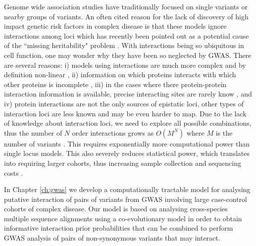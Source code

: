 Genome wide association studies have traditionally focused on single variants or nearby groups of variants. 
An often cited reason for the lack of discovery of high impact genetic risk factors in complex disease is that these models ignore interactions among loci \cite{cordell2009detecting} which has recently been pointed out as a potential cause of the ``missing heritability" problem \cite{zuk2012mystery, zuk2014searching}. 
With interactions being so ubiquitous in cell function, one may wonder why they have been so neglected by GWAS. 
There are several reasons: 
i) models using interactions are much more complex and by definition non-linear \cite{gao2010classification}, 
ii) information on which proteins interacts with which other proteins is incomplete \cite{venkatesan2009empirical},
iii) in the cases where there protein-protein interaction information is available, precise interacting sites are rarely know \cite{venkatesan2009empirical}, and
iv) protein interactions are not the only sources of epistatic loci, other types of interaction loci are less known and may be even harder to map.
Due to the lack of knowledge about interaction loci, we need to explore all possible combinations, thus the number of $N$ order interactions grows as $O(M^N)$ where $M$ is the number of variants \cite{de2013emerging}.
This requires exponentially more computational power than single locus models.
This also severely reduces statistical power, which translates into requiring larger cohorts, thus increasing sample collection and sequencing costs \cite{de2013emerging}.

In Chapter \ref{ch:gwas} we develop a computationally tractable model for analysing putative interaction of pairs of variants from GWAS involving large case-control cohorts of complex disease. 
Our model is based on analysing cross-species multiple sequence alignments using a co-evolutionary model in order to obtain informative interaction prior probabilities that can be combined to perform GWAS analysis of pairs of non-synonymous variants that may interact.

